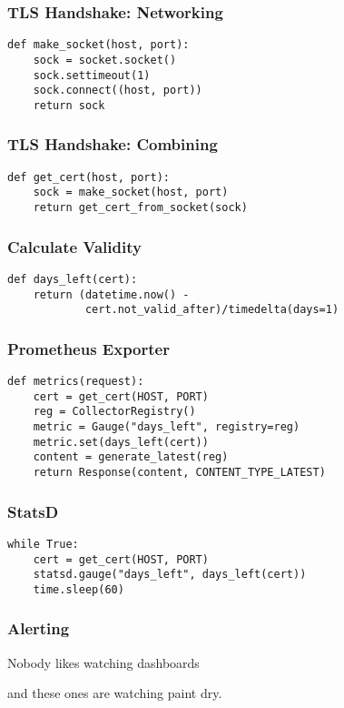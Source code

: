 \begin{frame}[fragile]
\frametitle{TLS Handshake: Networking}
\begin{lstlisting}
def make_socket(host, port):
    sock = socket.socket()
    sock.settimeout(1)
    sock.connect((host, port))
    return sock
\end{lstlisting}
\end{frame}

\begin{frame}[fragile]
\frametitle{TLS Handshake: Combining}
\begin{lstlisting}
def get_cert(host, port):
    sock = make_socket(host, port)
    return get_cert_from_socket(sock)
\end{lstlisting}
\end{frame}

\begin{frame}[fragile]
\frametitle{Calculate Validity}

\begin{lstlisting}
def days_left(cert):
    return (datetime.now() -
            cert.not_valid_after)/timedelta(days=1)
\end{lstlisting}
\end{frame}


\begin{frame}[fragile]
\frametitle{Prometheus Exporter}

\begin{lstlisting}
def metrics(request):
    cert = get_cert(HOST, PORT)
    reg = CollectorRegistry()
    metric = Gauge("days_left", registry=reg)
    metric.set(days_left(cert))
    content = generate_latest(reg)
    return Response(content, CONTENT_TYPE_LATEST)
\end{lstlisting}
\end{frame}

\begin{frame}[fragile]
\frametitle{StatsD}

\begin{lstlisting}
while True:
    cert = get_cert(HOST, PORT)
    statsd.gauge("days_left", days_left(cert))
    time.sleep(60)
\end{lstlisting}
\end{frame}

\begin{frame}
\frametitle{Alerting}

Nobody likes watching dashboards \pause

and these ones are watching paint dry.
\end{frame}

